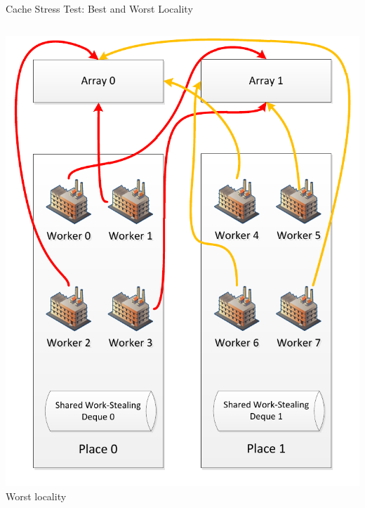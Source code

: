 \begin{frame}{Cache Stress Test: Best and Worst Locality}
\begin{columns}[c]
\begin{column}{0.50\textwidth}
\begin{center}
        \includegraphics[width=\textwidth]{figures/cache-stress-test-mafushi-worst} \\
        \tiny{Worst locality}
      \end{center}
    \end{column}
  \end{columns}
\end{frame}

